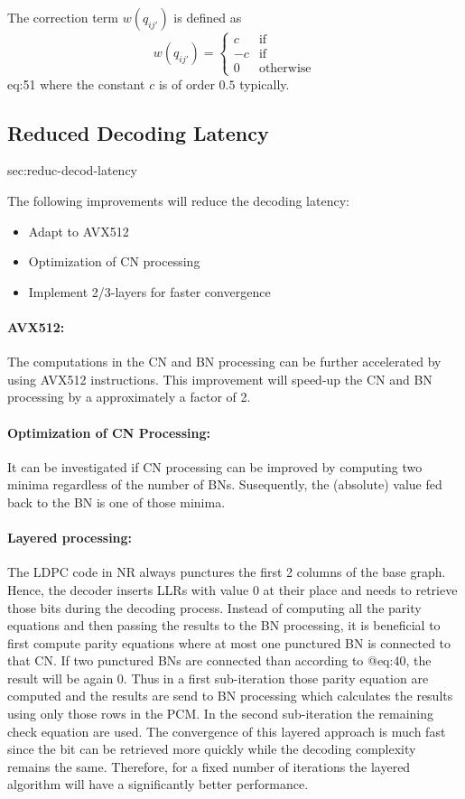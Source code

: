 \documentclass{article}
\begin{document}
The correction term $w(q_{ij'})$ is defined as
\begin{equation}
  w(q_{ij'}) =
  \begin{cases}
     c & \textrm{if}~  \\
    -c & \textrm{if}~ \\
     0 & \textrm{otherwise}
  \end{cases}
\end{equation}{eq:51}
where the constant $c$ is of order $0.5$ typically.

\subsection{Reduced Decoding Latency}{sec:reduc-decod-latency}

The following improvements will reduce the decoding latency:

\begin{itemize}
\item Adapt to AVX512
\item Optimization of CN processing
\item Implement 2/3-layers for faster convergence
\end{itemize}

\paragraph{AVX512:}
The computations in the CN and BN processing can be further accelerated by using AVX512 instructions. This improvement will speed-up the CN and BN processing by a approximately a factor of 2.

\paragraph{Optimization of CN Processing:}
It can be investigated if CN processing can be improved by computing two minima regardless of the number of BNs. Susequently, the (absolute) value fed back to the BN is one of those minima.

\paragraph{Layered processing:}
The LDPC code in NR always punctures the first 2 columns of the base graph. Hence, the decoder inserts LLRs with value 0 at their place and needs to retrieve those bits during the decoding process. Instead of computing all the parity equations and then passing the results to the BN processing, it is beneficial to first compute parity equations where at most one punctured BN is connected to that CN. If two punctured BNs are connected than according to @eq:40, the result will be again 0. Thus in a first sub-iteration those parity equation are computed and the results are send to BN processing which calculates the results using only those rows in the PCM. In the second sub-iteration the remaining check equation are used.
The convergence of this layered approach is much fast since the bit can be retrieved more quickly while the decoding complexity remains the same. Therefore, for a fixed number of iterations the layered algorithm will have a significantly better performance.

\newpage


\end{document}
